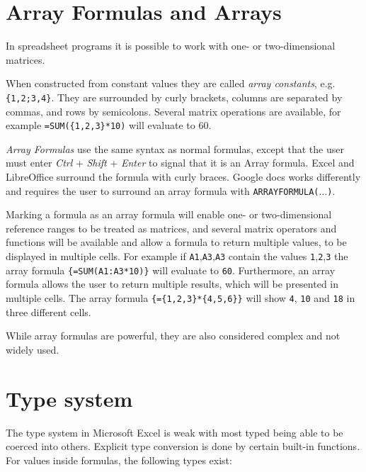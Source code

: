 \documentclass[12pt,a4paper,onecolumn,oneside]{memoir}
\newcommand{\f}[1]{\texttt{#1}}
\begin{document}
\section{Array Formulas and Arrays}
\label{sec:arrayformulas}
In spreadsheet programs it is possible to work with one- or two-dimensional matrices.

When constructed from constant values they are called \emph{array constants}, e.g. \f{\{1,2;3,4\}}.
They are surrounded by curly brackets, columns are separated by commas, and rows by semicolons.
Several matrix operations are available, for example \f{=SUM(\{1,2,3\}*10)} will evaluate to 60.

\emph{Array Formulas} use the same syntax as normal formulas, except that the user must enter \emph{Ctrl} + \emph{Shift} + \emph{Enter} to signal that it is an Array formula.
Excel and LibreOffice surround the formula with curly braces.
Google docs works differently and requires the user to surround an array formula with \f{ARRAYFORMULA($\ldots$)}.

Marking a formula as an array formula will enable one- or two-dimensional reference ranges to be treated as matrices, and several matrix operators and functions will be available and allow a formula to return multiple values, to be displayed in multiple cells.
For example if \f{A1},\f{A3},\f{A3} contain the values \f{1},\f{2},\f{3} the array formula \f{\{=SUM(A1:A3*10)\}} will evaluate to \f{60}.
Furthermore, an array formula allows the user to return multiple results, which will be presented in multiple cells.
The array formula \f{\{=\{1,2,3\}*\{4,5,6\}\}} will show \f{4}, \f{10} and \f{18} in three different cells.

While array formulas are powerful, they are also considered complex and not widely used.  \cite{Something}

\section{Type system}

The type system in Microsoft Excel is weak with most typed being able to be coerced into others.
Explicit type conversion is done by certain built-in functions.
For values inside formulas, the following types exist:
\end{document}
